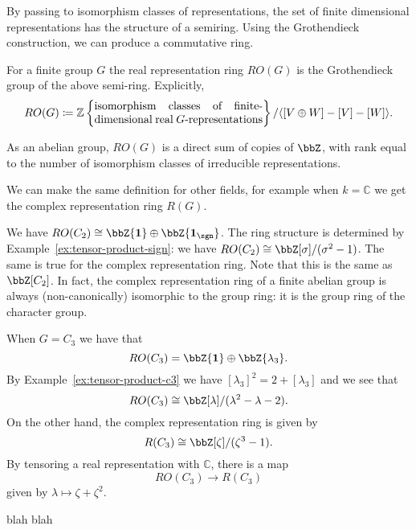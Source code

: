 \documentclass{willowtreebook}
\begin{document}
\begin{remark}
    By passing to isomorphism classes of representations, the set of finite dimensional representations has the structure of a semiring. Using the Grothendieck construction, we can produce a commutative ring. 
\end{remark}
\begin{definition}
    For a finite group $G$ the real representation ring $RO(G)$ is the Grothendieck group of the above semi-ring. Explicitly,
    \[
RO(G) \coloneqq \mathbb{Z}\left\{ \parbox{15em}{isomorphism classes of finite-dimensional real $G$-representations} \right\}/\langle [ V \oplus W] - [V] - [W] \rangle .
    \]
\end{definition}
\begin{remark}
    As an abelian group, $RO(G)$ is a direct sum of copies of $\bbZ$, with rank equal to the number of isomorphism classes of irreducible representations. 
\end{remark}
\begin{remark}
    We can make the same definition for other fields, for example when $k = \mathbb{C}$ we get the complex representation ring $R(G)$. 
\end{remark}
\begin{example}
    We have $RO(C_2) \cong \bbZ\{ \mathbf{1} \} \oplus \bbZ\{\mathbf{1}_{\sgn}\}$. The ring structure is determined by Example~\eqref{ex:tensor-product-sign}: we have $RO(C_2) \cong \bbZ[\sigma]/(\sigma^2-1)$. The same is true for the complex representation ring. Note that this is the same as $\bbZ[C_2]$. In fact, the complex representation ring of a finite abelian group is always (non-canonically) isomorphic to the group ring: it is the group ring of the character group. 
\end{example}
\begin{example}
    When $G = C_3$ we have that
    \[
RO(C_3) = \bbZ\{ \mathbf{1} \} \oplus \bbZ\{ \lambda_3 \}. 
    \]
    By Example~\eqref{ex:tensor-product-c3} we have $[\lambda_3]^2 = 2 + [\lambda_3]$ and we see that
    \[
RO(C_3) \cong \bbZ[\lambda]/(\lambda^2-\lambda-2). 
    \]
    On the other hand, the complex representation ring is given by \[
    R(C_3) \cong \bbZ[\zeta]/(\zeta^3-1).
    \]
    By tensoring a real representation with $\mathbb{C}$, there is a map
    \[
RO(C_3) \to R(C_3)
    \]
    given by $\lambda \mapsto \zeta + \zeta^2$. 
\end{example}
blah blah
\par\bigskip\noindent

\end{document}
